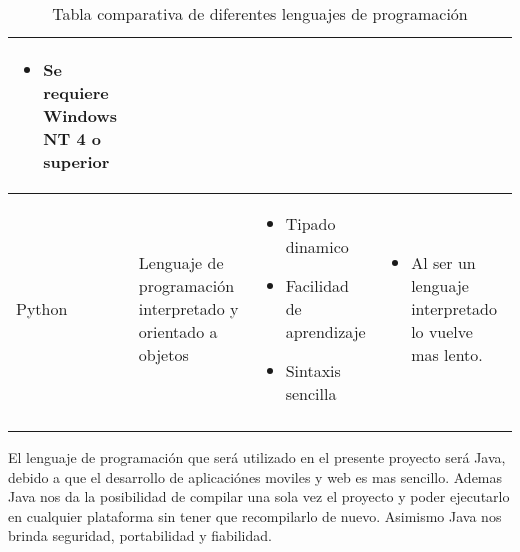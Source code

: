 \begin{longtable}{|M{2.5cm}|M{3cm}|M{4.2cm}|M{4.3cm}|}
\begin{itemize}
		\item Se requiere Windows NT 4 o superior
	\end{itemize} \\ \hline
		Python & Lenguaje de programación interpretado y orientado a objetos & \begin{itemize}
			\item Tipado dinamico
			\item Facilidad de aprendizaje
			\item Sintaxis sencilla
		\end{itemize} & \begin{itemize}
		\item Al ser un lenguaje interpretado lo vuelve mas lento.
	\end{itemize} \\ \hline
	\caption{Tabla comparativa de diferentes lenguajes de programación}
	\label{tabla_lenguajes}
\end{longtable}
El lenguaje de programación que será utilizado en el presente proyecto será Java, debido a que el desarrollo de aplicaciónes moviles y web es mas sencillo. Ademas Java nos da la posibilidad de compilar una sola vez el proyecto y poder ejecutarlo en cualquier plataforma sin tener que recompilarlo de nuevo. Asimismo Java nos brinda seguridad, portabilidad y fiabilidad.